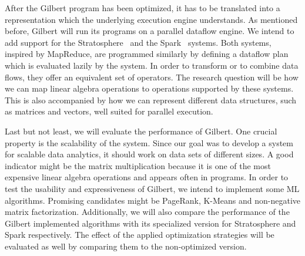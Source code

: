 After the Gilbert program has been optimized, it has to be translated into a representation which the underlying execution engine understands.
As mentioned before, Gilbert will run its programs on a parallel dataflow engine.
We intend to add support for the Stratosphere~\cite{alexandrov:2011a} and the Spark~\cite{zaharia:2010a} systems.
Both systems, inspired by MapReduce, are programmed similarly by defining a dataflow plan which is evaluated lazily by the system.
In order to transform or to combine data flows, they offer an equivalent set of operators.
The research question will be how we can map linear algebra operations to operations supported by these systems.
This is also accompanied by how we can represent different data structures, such as matrices and vectors, well suited for parallel execution.

Last but not least, we will evaluate the performance of Gilbert.
One crucial property is the scalability of the system.
Since our goal was to develop a system for scalable data analytics, it should work on data sets of different sizes.
A good indicator might be the matrix multiplication because it is one of the most expensive linear algebra operations and appears often in programs.
In order to test the usability and expressiveness of Gilbert, we intend to implement some ML algorithms.
Promising candidates might be PageRank, K-Means and non-negative matrix factorization.
Additionally, we will also compare the performance of the Gilbert implemented algorithms with its specialized version for Stratosphere and Spark respectively.
The effect of the applied optimization strategies will be evaluated as well by comparing them to the non-optimized version.